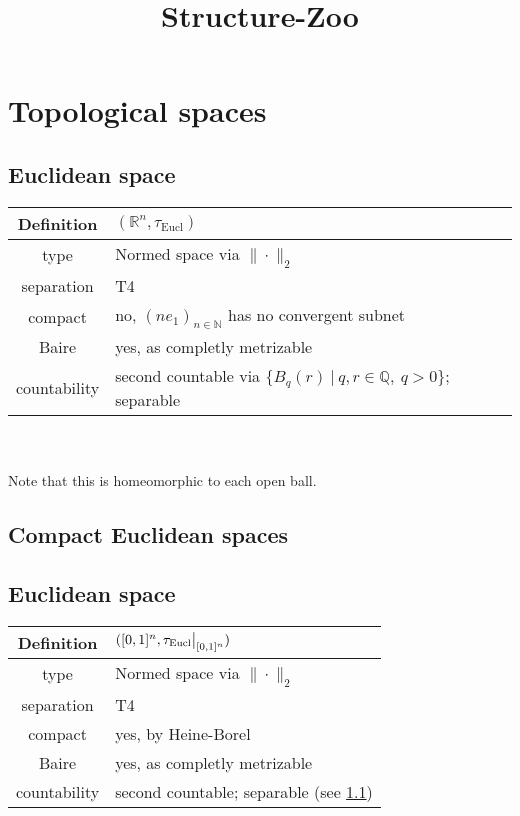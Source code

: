 \documentclass{scrartcl}
\title{Structure-Zoo}
\date{}
\newcommand{\R}{\mathbb{R}}
\newcommand{\N}{\mathbb{N}}
\newcommand{\Q}{\mathbb{Q}}
\newcommand\restr[2]{{
    \left.\kern-\nulldelimiterspace
    #1
    \vphantom{\big|}
    \right|_{#2}
}}
\begin{document}
\maketitle
\tableofcontents

\section{Topological spaces}

\subsection{Euclidean space}
\label{top:euclidean}
\begin{tabular}{c | p{}}
    Definition & $(\R^n, \tau_{\mathrm{Eucl}})$ \\
    \hline
    type & Normed space via $\|\cdot\|_2$ \\
    separation & T4 \\
    compact & no, $(ne_1)_{n \in \N}$ has no convergent subnet \\
    Baire & yes, as completly metrizable \\
    countability & second countable via $\{B_q(r) \ | \ q, r \in \Q, \ q > 0\}$; separable
\end{tabular}
\\\\
Note that this is homeomorphic to each open ball.

\subsection{Compact Euclidean spaces}

\subsection{Euclidean space}
\label{top:compact_euclidean}
\begin{tabular}{c | l}
    Definition & $([0, 1]^n, \restr{\tau_{\mathrm{Eucl}}}{[0, 1]^n})$ \\
    \hline
    type & Normed space via $\|\cdot\|_2$ \\
    separation & T4 \\
    compact & yes, by Heine-Borel \\
    Baire & yes, as completly metrizable \\
    countability & second countable; separable (see \ref{top:euclidean})
\end{tabular}
\end{document}

